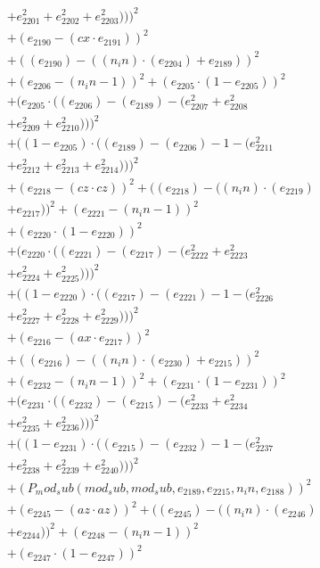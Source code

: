 \documentclass[10pt, a4paper]{article}
\begin{document}
\begin{small}
\begin{align*}
& + e_{2201}^{2} + e_{2202}^{2} + e_{2203}^{2})))^{2} \\
& + (e_{2190} - (cx  \cdot  e_{2191}))^{2} \\
& + ((e_{2190}) - ((n_in)  \cdot  (e_{2204}) + e_{2189}))^{2} \\
& + (e_{2206} - (n_in - 1))^{2} + (e_{2205}  \cdot  (1 - e_{2205}))^{2} \\
& + (e_{2205}  \cdot  ((e_{2206}) - (e_{2189}) - (e_{2207}^{2} + e_{2208}^{2} \\
& + e_{2209}^{2} + e_{2210}^{2})))^{2} \\
& + ((1 - e_{2205})  \cdot  ((e_{2189}) - (e_{2206}) - 1 - (e_{2211}^{2} \\
& + e_{2212}^{2} + e_{2213}^{2} + e_{2214}^{2})))^{2} \\
& + (e_{2218} - (cz  \cdot  cz))^{2} + ((e_{2218}) - ((n_in)  \cdot  (e_{2219}) \\
& + e_{2217}))^{2} + (e_{2221} - (n_in - 1))^{2} \\
& + (e_{2220}  \cdot  (1 - e_{2220}))^{2} \\
& + (e_{2220}  \cdot  ((e_{2221}) - (e_{2217}) - (e_{2222}^{2} + e_{2223}^{2} \\
& + e_{2224}^{2} + e_{2225}^{2})))^{2} \\
& + ((1 - e_{2220})  \cdot  ((e_{2217}) - (e_{2221}) - 1 - (e_{2226}^{2} \\
& + e_{2227}^{2} + e_{2228}^{2} + e_{2229}^{2})))^{2} \\
& + (e_{2216} - (ax  \cdot  e_{2217}))^{2} \\
& + ((e_{2216}) - ((n_in)  \cdot  (e_{2230}) + e_{2215}))^{2} \\
& + (e_{2232} - (n_in - 1))^{2} + (e_{2231}  \cdot  (1 - e_{2231}))^{2} \\
& + (e_{2231}  \cdot  ((e_{2232}) - (e_{2215}) - (e_{2233}^{2} + e_{2234}^{2} \\
& + e_{2235}^{2} + e_{2236}^{2})))^{2} \\
& + ((1 - e_{2231})  \cdot  ((e_{2215}) - (e_{2232}) - 1 - (e_{2237}^{2} \\
& + e_{2238}^{2} + e_{2239}^{2} + e_{2240}^{2})))^{2} \\
& + (P_mod_sub(mod_sub, mod_sub, e_{2189}, e_{2215}, n_in, e_{2188}))^{2} \\
& + (e_{2245} - (az  \cdot  az))^{2} + ((e_{2245}) - ((n_in)  \cdot  (e_{2246}) \\
& + e_{2244}))^{2} + (e_{2248} - (n_in - 1))^{2} \\
& + (e_{2247}  \cdot  (1 - e_{2247}))^{2} \\

\end{align*}
\end{small}
\end{document}
